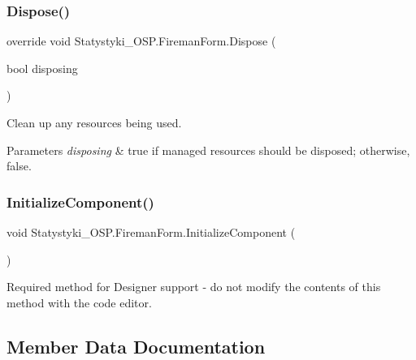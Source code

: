 \subsubsection{\texorpdfstring{Dispose()}{Dispose()}}
{\footnotesize\ttfamily override void Statystyki\+\_\+\+O\+S\+P.\+Fireman\+Form.\+Dispose (\begin{DoxyParamCaption}\item[{bool}]{disposing }\end{DoxyParamCaption})\hspace{0.3cm}{\ttfamily [protected]}}



Clean up any resources being used. 


\begin{DoxyParams}{Parameters}
{\em disposing} & true if managed resources should be disposed; otherwise, false.\\
\hline
\end{DoxyParams}
\mbox{\label{class_statystyki___o_s_p_1_1_fireman_form_a760acdc7c3f9dd972feeff92a49b4ece}} 
\subsubsection{\texorpdfstring{InitializeComponent()}{InitializeComponent()}}
{\footnotesize\ttfamily void Statystyki\+\_\+\+O\+S\+P.\+Fireman\+Form.\+Initialize\+Component (\begin{DoxyParamCaption}{ }\end{DoxyParamCaption})\hspace{0.3cm}{\ttfamily [private]}}



Required method for Designer support -\/ do not modify the contents of this method with the code editor. 



\subsection{Member Data Documentation}
\mbox{\label{class_statystyki___o_s_p_1_1_fireman_form_a69e8d0f2e55d8392c940ae92395fa920}} 
